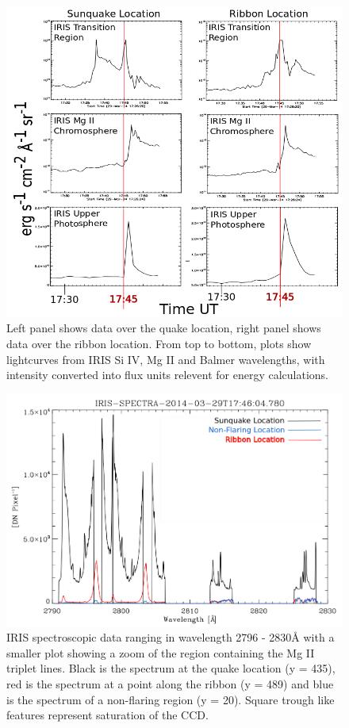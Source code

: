 \begin{figure}%
  \begin{center}
  \includegraphics[width=1.0\textwidth]{lcfluxseries}
  \end{center}
  \caption{Left panel shows data over the quake location, right panel shows data over the ribbon location. From top to bottom, plots show lightcurves from IRIS Si IV, Mg II and Balmer wavelengths, with intensity converted into flux units relevent for energy calculations.}\label{lcfluxseries}
\end{figure}

\begin{figure}%
  \begin{center}
  \includegraphics[width=1.0\textwidth]{spectra}
  \end{center}
  \caption{IRIS spectroscopic data ranging in wavelength 2796 - 2830Å with a smaller plot showing a zoom of the region containing the Mg II triplet lines. Black is the spectrum at the quake location (y = 435), red is the spectrum at a point along the ribbon (y = 489) and blue is the spectrum of a non-flaring region (y = 20). Square trough like features represent saturation of the CCD.}
\end{figure}\label{spectra}
 


